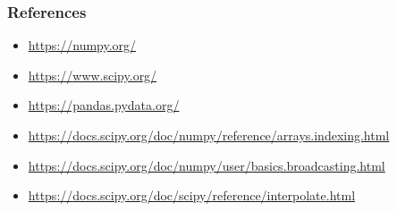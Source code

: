 \documentclass[9pt]{beamer}
\begin{document}
\begin{frame}
  \frametitle{References}
  \scriptsize
  \begin{itemize}
  \item \url{https://numpy.org/}
  \item \url{https://www.scipy.org/}
  \item \url{https://pandas.pydata.org/}
  \item \url{https://docs.scipy.org/doc/numpy/reference/arrays.indexing.html}
  \item \url{https://docs.scipy.org/doc/numpy/user/basics.broadcasting.html}
  \item \url{https://docs.scipy.org/doc/scipy/reference/interpolate.html}
  \end{itemize}
\end{frame}
\end{document}
